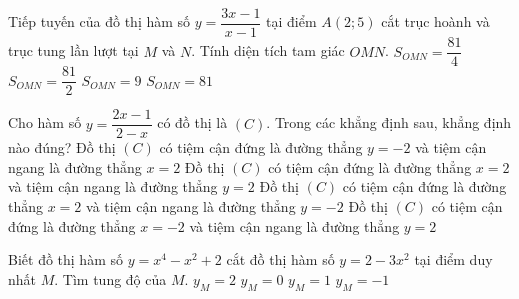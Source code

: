 \begin{ex}%
Tiếp tuyến của đồ thị hàm số $y=\dfrac{3x-1}{x-1}$ tại điểm $A(2;5)$ cắt trục hoành và trục tung lần lượt tại $M$ và $N$. Tính diện tích tam giác $OMN$.
\choice
{\True $S_{OMN}=\dfrac{81}{4}$}
{$S_{OMN}=\dfrac{81}{2}$}
{$S_{OMN}=9$}
{$S_{OMN}=81$}
\end{ex}

\begin{ex}%
\end{ex}

\begin{ex}%
Cho hàm số $y=\dfrac{2x-1}{2-x}$ có đồ thị là $(C)$. Trong các khẳng định sau, khẳng định nào đúng?
\choice
{Đồ thị $(C)$ có tiệm cận đứng là đường thẳng $y=-2$ và tiệm cận ngang là đường thẳng $x=2$}
{Đồ thị $(C)$ có tiệm cận đứng là đường thẳng $x=2$ và tiệm cận ngang là đường thẳng $y=2$}
{\True Đồ thị $(C)$ có tiệm cận đứng là đường thẳng $x=2$ và tiệm cận ngang là đường thẳng $y=-2$}
{Đồ thị $(C)$ có tiệm cận đứng là đường thẳng $x=-2$ và tiệm cận ngang là đường thẳng $y=2$} 
\end{ex}

\begin{ex}%
Biết đồ thị hàm số $y=x^4-x^2+2$ cắt đồ thị hàm số $y=2-3x^2$ tại điểm duy nhất $M$. Tìm tung độ của $M$.
\choice
{\True $y_M=2$}
{$y_M=0$}
{$y_M=1$}
{$y_M=-1$}
\end{ex}

